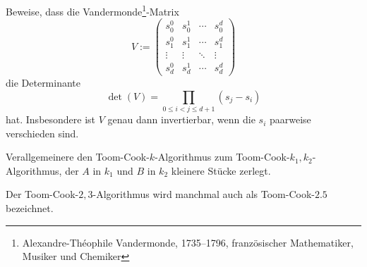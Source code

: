 
\begin{sheet}

\begin{problem}[title={Vandermonde-Determinante}]
Beweise, dass die Vandermonde\footnote{Alexandre-Théophile Vandermonde, 1735--1796, französischer Mathematiker, Musiker und Chemiker}-Matrix
\[V:=\begin{pmatrix}
s_0^0 & s_0^1 & \cdots & s_0^d \\
s_1^0 & s_1^1 & \cdots & s_1^d \\
\vdots & \vdots & \ddots & \vdots \\
s_d^0 & s_d^1 & \cdots & s_d^d
\end{pmatrix}\]
die Determinante
\[\det(V) = \prod_{0\leq i<j\leq d+1} (s_j-s_i)\]
hat. Insbesondere ist $V$ genau dann invertierbar, wenn die $s_i$ paarweise verschieden sind.
\end{problem}

\begin{problem}
Verallgemeinere den Toom-Cook-$k$-Algorithmus zum Toom-Cook-$k_1,k_2$-Algorithmus, der $A$ in $k_1$ und $B$ in $k_2$ kleinere Stücke zerlegt.
\end{problem}

\begin{remark}
Der Toom-Cook-$2,3$-Algorithmus wird manchmal auch als Toom-Cook-$2.5$ bezeichnet.
\end{remark}

\end{sheet}